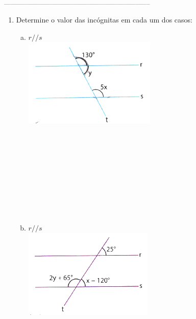 \documentclass[a4paper,14pt]{article}
\begin{document}
\begin{multicols}{2}
		\noindent\textsubscript{--------------------------------------------------------------------------}
		\begin{enumerate} 
			\item Determine o valor das incógnitas em cada um dos casos:
			\begin{enumerate}[a)]
				\item $r // s$ \\
				\includegraphics[width=1\linewidth]{6FMA144_imagens/imagem2} \\\\\\\\\\\\\\\\\\\\
				\item $r // s$ \\
				\includegraphics[width=1\linewidth]{6FMA144_imagens/imagem3} \newpage

\end{enumerate}
\end{enumerate}
\end{multicols}
\end{document}
